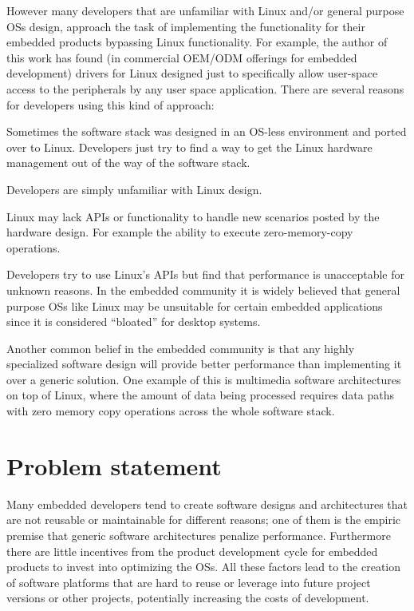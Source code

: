 However many developers that are unfamiliar with Linux and/or general purpose \acp{OS} design, approach the task of implementing the functionality for their embedded products bypassing Linux functionality. For example, the author of this work has found (in commercial \ac{OEM}/\ac{ODM} offerings for embedded development) drivers for Linux designed just to specifically allow user-space access to the peripherals by any user space application.  There are several reasons for developers using this kind of approach:
\begin{itemize*}
\item Sometimes the software stack was designed in an \ac{OS}-less environment and ported over to Linux. Developers just try to find a way to get the Linux hardware management out of the way of the software stack.
\item Developers are simply unfamiliar with Linux design.
\item Linux may lack APIs or functionality to handle new scenarios posted by the hardware design. For example the ability to execute zero-memory-copy operations.
\item Developers try to use Linux's APIs but find that performance is unacceptable for unknown reasons. In the embedded community it is widely believed that general purpose \acp{OS} like Linux may be unsuitable for certain embedded applications since it is considered ``bloated'' for desktop systems\cite{Gatliff:fk}.
\end{itemize*}

Another common belief in the embedded community is that any highly specialized software design will provide better performance than implementing it over a generic solution. One example of this is multimedia software architectures on top of Linux, where the amount of data being processed requires data paths with zero memory copy operations across the whole software stack.
 
\section{Problem statement}
Many embedded developers tend to create software designs and architectures that are not reusable or maintainable for different reasons; one of them is the empiric premise that generic software architectures penalize performance. Furthermore there are little incentives from the product development cycle for embedded products to invest into optimizing the \acp{OS}. All these factors lead to the creation of software platforms that are hard to reuse or leverage into future project versions or other projects, potentially increasing the costs of development.

